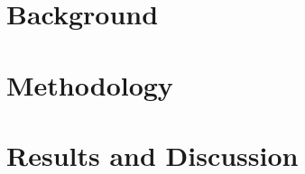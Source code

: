 \documentclass[11pt, oneside, openright]{Thesis} %
\begin{document}
\pagestyle{fancy} %



\part{Background}
 

\part{Methodology}
 
 
 
\part{Results and Discussion}
 



\appendix %








\backmatter


\label{Bibliography}

\end{document}
